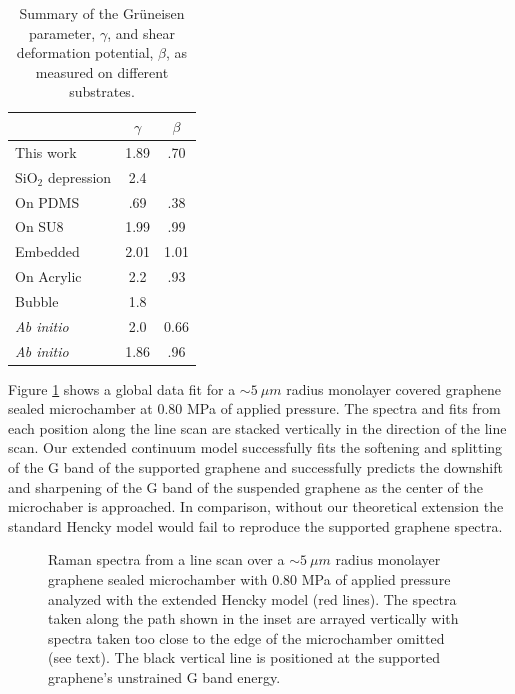 \begin{table}
	\begin{center}
	\begin{tabular}{l c  c }
		\hline
		\hline
		 & $\gamma$ & $\beta$ \\
		 \hline
		 This work & 1.89 & .70 \\
		 $\mathrm{SiO_2}$ depression\cite{Metzger2010} & 2.4 & \\
		 On PDMS\cite{Huang2009} & .69 & .38 \\
		 On SU8\cite{Mohiuddin2009} & 1.99 & .99\\
		 Embedded\cite{Frank2010} & 2.01 & 1.01 \\
		 On Acrylic\cite{Yoon2011} & 2.2 & .93\\
		 Bubble\cite{Zabel2012} & 1.8 \\
		\textit{Ab initio} \cite{Thomsen2002} & 2.0 & 0.66 \\
		\textit{Ab initio} \cite{Cheng2011} & 1.86 & .96\\
		 \hline
		 \hline
	\end{tabular}
	\end{center}
	\caption[Summary of the Gr\"{u}neisen parameter, $\gamma$, and shear deformation potential, $\beta$, as measured on different substrates]{\label{tab:fri:gb} Summary of the Gr\"{u}neisen parameter, $\gamma$, and shear deformation potential, $\beta$, as measured on different substrates.}
\end{table}

Figure \ref{fig:fri:fitlinescan} shows a global data fit for a $\sim 5 \ \mu m$ radius monolayer covered graphene sealed microchamber at 0.80 MPa of applied pressure.
The spectra and fits from each position along the line scan are stacked vertically in the direction of the line scan.
Our extended continuum model successfully fits the softening and splitting of the G band of the supported graphene and successfully predicts the downshift and sharpening of the G band of the suspended graphene as the center of the microchaber is approached.
In comparison, without our theoretical extension the standard Hencky model would fail to reproduce the supported graphene spectra.

\begin{figure}
	\begin{center}
	
	\end{center}
	\caption[Raman spectra from a line scan over a $\sim 5 \ \mu m$ radius monolayer graphene sealed microchamber with 0.80 MPa of applied pressure analyzed with the extended Hencky model (red lines)]{\label{fig:fri:fitlinescan} Raman spectra from a line scan over a $\sim 5 \ \mu m$ radius monolayer graphene sealed microchamber with 0.80 MPa of applied pressure analyzed with the extended Hencky model (red lines).  The spectra taken along the path shown in the inset are arrayed vertically with spectra taken too close to the edge of the microchamber omitted (see text).  The black vertical line is positioned at the supported graphene's unstrained G band energy.}
\end{figure}

